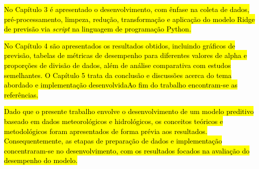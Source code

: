 \hl{No Capítulo 3 é apresentado o desenvolvimento, com ênfase na coleta de dados, pré-processamento, limpeza, redução, transformação e aplicação do modelo Ridge de previsão via \textit{script} na linguagem de programação Python.}

\hl{No Capítulo 4 são apresentados os resultados obtidos, incluindo gráficos de previsão, tabelas de métricas de desempenho para diferentes valores de alpha e proporções de divisão de dados, além de análise comparativa com estudos semelhantes. O Capítulo 5 trata da conclusão e discussões acerca do tema abordado e implementação desenvolvidaAo fim do trabalho encontram-se as referências.}

\hl{Dado que o presente trabalho envolve o desenvolvimento de um modelo preditivo baseado em dados meteorológicos e hidrológicos, os conceitos teóricos e metodológicos foram apresentados de forma prévia aos resultados. Consequentemente, as etapas de preparação de dados e implementação concentraram-se no desenvolvimento, com os resultados focados na avaliação do desempenho do modelo.}